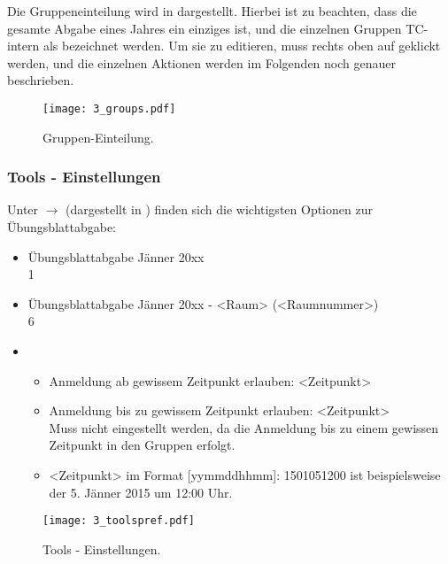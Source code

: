 Die Gruppeneinteilung wird in  dargestellt. Hierbei ist zu
beachten, dass die gesamte Abgabe eines Jahres ein einziges 
ist, und die einzelnen Gruppen TC-intern als  bezeichnet werden.
Um sie zu editieren, muss rechts oben auf  geklickt werden, und
die einzelnen Aktionen werden im Folgenden noch genauer beschrieben.

\begin{figure}[htbp]
\begin{center}
  \texttt{[image: 3\_groups.pdf]}
  \caption{ Gruppen-Einteilung.}
  \label{fig:groups}
\end{center}
\end{figure}

\subsubsection{Tools - Einstellungen}

Unter  $\to$  
(dargestellt in ) finden sich die wichtigsten Optionen zur
Übungsblattabgabe:
\begin{itemize}
\item {} Übungsblattabgabe Jänner 20xx\\
   1
\item {} Übungsblattabgabe Jänner 20xx - <Raum> (<Raumnummer>)\\
   6
\item {}
  \begin{itemize}
    \item  Anmeldung ab gewissem Zeitpunkt erlauben: 
       <Zeitpunkt>
    \item  Anmeldung bis zu gewissem Zeitpunkt erlauben: 
       <Zeitpunkt>\\
      Muss nicht eingestellt werden, da die Anmeldung bis zu einem gewissen
      Zeitpunkt in den Gruppen erfolgt.
    \item <Zeitpunkt> im Format [yymmddhhmm]: 1501051200 ist beispielsweise
      der 5. Jänner 2015 um 12:00 Uhr.
  \end{itemize}
\end{itemize}

\begin{figure}[htbp]
  \begin{center}
  \texttt{[image: 3\_toolspref.pdf]}
  \caption{ Tools - Einstellungen.}
  \label{fig:toolspref}
  \end{center}
\end{figure}


